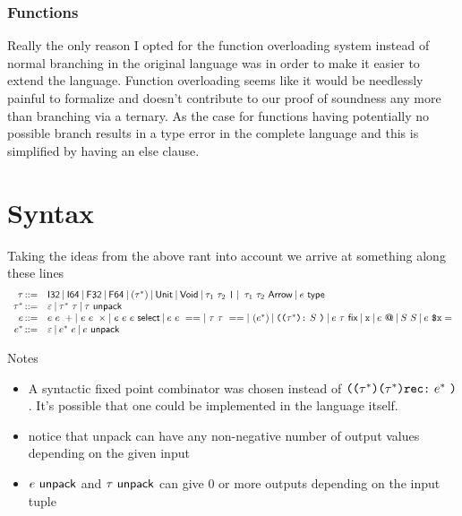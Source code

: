 \documentclass{article}
\begin{document}
\subsubsection{Functions}
Really the only reason I opted for the function overloading system instead of normal branching in the original language was in order to make it easier to extend the language.
Function overloading seems like it would be needlessly painful to formalize and doesn't contribute to our proof of soundness any more than branching via a ternary. As the case for functions having potentially no possible branch results in a type error in the complete language and this is simplified by having an else clause.

\section{Syntax}
Taking the ideas from the above rant into account we arrive at something along these lines
\[
\begin{array}{r l}
    \tau \mathop{::=} & \mathsf{I32} \mathbin{|} \mathsf{I64} \mathbin{|} \mathsf{F32} \mathbin{|} \mathsf{F64} \mathbin{|} 
        (\tau^*) \mathbin{|} \mathsf{Unit} \mathbin{|} \mathsf{Void} \mathbin{|} \tau_1~ \tau_2~ \texttt{|} 
        \mathbin{|} ~ \tau_1 ~ \tau_2 ~ \mathsf{Arrow} \mathbin{|} e ~ \mathsf{type}\\
        
    \tau^* \mathop{::=} & \varepsilon \mathbin{|} \tau^* ~ \tau \mathbin{|} \tau ~ \mathsf{unpack}\\

    e \mathop{::=} & e~e~+ \mathbin{|} ~e~e~\times \mathbin{|} ~ e ~ e ~ e ~ \mathsf{select} 
        \mathbin{|} e~e~== \mathbin{|} ~ \tau~ \tau~ ==
        \mathbin{|} ~ ( e^* )
        \mathbin{|} \texttt{((} \tau^* \texttt{):} ~ S ~ \texttt{)} \mathbin{|} e ~ \tau ~ \mathsf{fix}
        \mathbin{|} \texttt{x} \mathbin{|} e ~ \textbf{@} 
        \mathbin{|} S~ S \mathbin{|} e~ \texttt{\$x} = \\

    e^* \mathop{::=} & \varepsilon \mathbin{|} e^* ~ e \mathbin{|} e ~ \mathsf{unpack}\\

\end{array}
\]

Notes
\begin{itemize}
    \item A syntactic fixed point combinator was chosen instead of $\texttt{((} \tau^* \texttt{)(} \tau^* \texttt{)rec:} ~ e^* ~ \texttt{)}$. It's possible that one could be implemented in the language itself.
    \item notice that unpack can have any non-negative number of output values depending on the given input
    \item $e ~ \mathsf{unpack}$ and $\tau ~ \mathsf{unpack}$ can give 0 or more outputs depending on the input tuple
\end{itemize}
\end{document}

